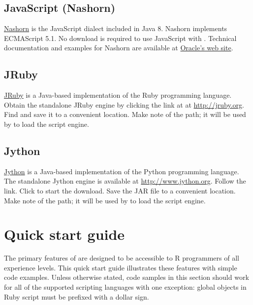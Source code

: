 \subsection{JavaScript (Nashorn)}

\href{https://docs.oracle.com/javase/8/docs/technotes/guides/scripting/nashorn/}{Nashorn} is the JavaScript dialect included in Java 8. Nashorn implements ECMAScript 5.1. No download is required to use JavaScript with . Technical documentation and examples for Nashorn are available at \href{https://docs.oracle.com/javase/8/docs/technotes/guides/scripting/nashorn/}{Oracle's web site}.

\subsection{JRuby}

\href{http://jruby.org}{JRuby} is a Java-based implementation of the Ruby programming language. Obtain the standalone JRuby engine by clicking the  link at at \url{http://jruby.org}. Find  and save it to a convenient location. Make note of the path; it will be used by  to load the script engine.

\subsection{Jython}

\href{http://www.jython.org}{Jython} is a Java-based implementation of the Python programming language. The standalone Jython engine is available at \url{http://www.jython.org}. Follow the  link. Click  to start the download. Save the JAR file to a convenient location. Make note of the path; it will be used by  to load the script engine.

\section{Quick start guide}

The primary features of  are designed to be accessible to R programmers of all experience levels. This quick start guide illustrates these features with simple code examples. Unless otherwise stated, code samples in this section should work for all of the supported scripting languages with one exception: global objects in Ruby script must be prefixed with a dollar sign. 

